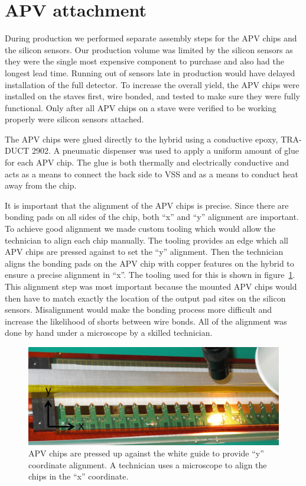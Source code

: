 \documentclass[1p,12pt]{elsarticle}
\begin{document}
\section{APV attachment}
During production we performed separate assembly steps for the APV chips and the
silicon sensors. Our production volume was limited by the silicon sensors as they were
the single most expensive component to purchase and also had the longest lead
time. Running out of sensors late in production would have delayed installation
of the full detector. To increase the overall yield, the APV chips were
installed on the staves first, wire bonded, and tested to make sure they were
fully functional. Only after all APV chips on a stave were verified to be
working properly were silicon sensors attached.

The APV chips were glued directly to the hybrid using a conductive epoxy, TRA-DUCT
2902. A pneumatic dispenser was used to apply a uniform amount of glue for each
APV chip. The glue is both thermally and electrically conductive and acts as a
means to connect the back side to VSS and as a means to conduct heat away from
the chip.

It is important that the alignment of the APV chips is precise. Since there are
bonding pads on all sides of the chip, both ``x'' and ``y'' alignment are important.
To achieve good alignment we made custom tooling which would allow the
technician to align each chip manually. The tooling provides an edge which all
APV chips are pressed against to set the ``y'' alignment. Then the technician
aligns the bonding pads on the APV chip with copper features on the hybrid to
ensure a precise alignment in ``x''. The tooling used for this is shown in
figure~\ref{fig:apv_attach}. This alignment step was most important
because the mounted APV chips would then have to match exactly the location of
the output pad sites on the silicon sensors. Misalignment would make the bonding
process more difficult and increase the likelihood of shorts between wire bonds.
All of the alignment was done by hand under a microscope by a skilled
technician.

\begin{figure}[h]
\begin{center}
\includegraphics[width=5in, keepaspectratio=true, angle=0]{graphics/apv_attach_tooling.jpg}
\caption{APV chips are pressed up against the white guide to provide ``y'' coordinate
alignment.  A technician uses a microscope to align the chips in the ``x'' coordinate.
\label{fig:apv_attach}}
\end{center}
\end{figure}
%
\end{document}
